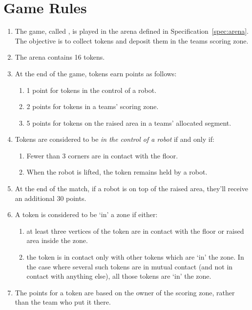 \section{Game Rules}
\label{sec:rules}

\begin{enumerate}
  \item The game, called \emph{\gamename}, is played in the arena defined in
        Specification~\ref{spec:arena}. The objective is to collect tokens and
        deposit them in the teams scoring zone.
  \item The arena contains 16 tokens.
  \item At the end of the game, tokens earn points as follows:
    \begin{enumerate}
      \item 1 point for tokens in the control of a robot.
      \item 2 points for tokens in a teams' scoring zone.
      \item 5 points for tokens on the raised area in a teams' allocated segment.
    \end{enumerate}
  \item Tokens are considered to be \textit{in the control of a robot} if and only if:
    \begin{enumerate}
      \item Fewer than 3 corners are in contact with the floor.
      \item When the robot is lifted, the token remains held by a robot.
    \end{enumerate}
  \item At the end of the match, if a robot is on top of the raised area, they'll
        receive an additional 30 points.
  \item A token is considered to be `in' a zone if either:
    \begin{enumerate}
      \item at least three vertices of the token are in contact with the floor or
            raised area inside the zone.
      \item the token is in contact only with other tokens which are `in' the zone.
            In the case where several such tokens are in mutual contact (and not in
            contact with anything else), all those tokens are `in' the zone.
    \end{enumerate}
  \item The points for a token are based on the owner of the scoring zone, rather than
        the team who put it there.

\end{enumerate}
